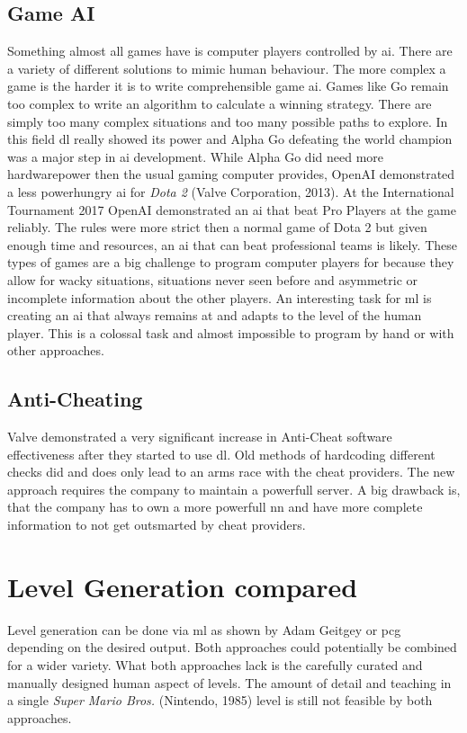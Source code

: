 \documentclass[10pt,a4paper]{article}
\begin{document}
\subsection{Game AI}
Something almost all games have is computer players controlled by \gls{ai}. There are a variety of different solutions to mimic human behaviour. The more complex a game is the harder it is to write comprehensible game \gls{ai}. Games like Go remain too complex to write an algorithm to calculate a winning strategy. There are simply too many complex situations and too many possible paths to explore. In this field \gls{dl} really showed its power and Alpha Go defeating the world champion was a major step in \gls{ai} development\cite{Silver2016}\cite{Silver2017}. While Alpha Go did need more hardwarepower then the usual gaming computer provides, OpenAI demonstrated a less powerhungry \gls{ai} for \textit{Dota 2} (Valve Corporation, 2013). At the International Tournament 2017 OpenAI demonstrated an \gls{ai} that beat Pro Players at the game reliably\cite{Openai2017}. The rules were more strict then a normal game of Dota 2 but given enough time and resources, an \gls{ai} that can beat professional teams is likely. These types of games are a big challenge to program computer players for because they allow for wacky situations, situations never seen before and asymmetric or incomplete information about the other players. An interesting task for \gls{ml} is creating an \gls{ai} that always remains at and adapts to the level of the human player. This is a colossal task and almost impossible to program by hand or with other approaches.

\subsection{Anti-Cheating}
Valve demonstrated a very significant increase in Anti-Cheat software effectiveness after they started to use \gls{dl}. Old methods of hardcoding different checks did and does only lead to an arms race with the cheat providers. The new approach requires the company to maintain a powerfull server. A big drawback is, that the company has to own a more powerfull \gls{nn} and have more complete information to not get outsmarted by cheat providers\cite{McDonald2018}.

\section{Level Generation compared}
Level generation can be done via \gls{ml} as shown by Adam Geitgey\citep{AdamGeitgey2016} or \gls{pcg} depending on the desired output. Both approaches could potentially be combined for a wider variety. What both approaches lack is the carefully curated and manually designed human aspect of levels. The amount of detail and teaching in a single \textit{Super Mario Bros.} (Nintendo, 1985) level\cite{EurogamerMiyamotoInterview} is still not feasible by both approaches.
\end{document}
